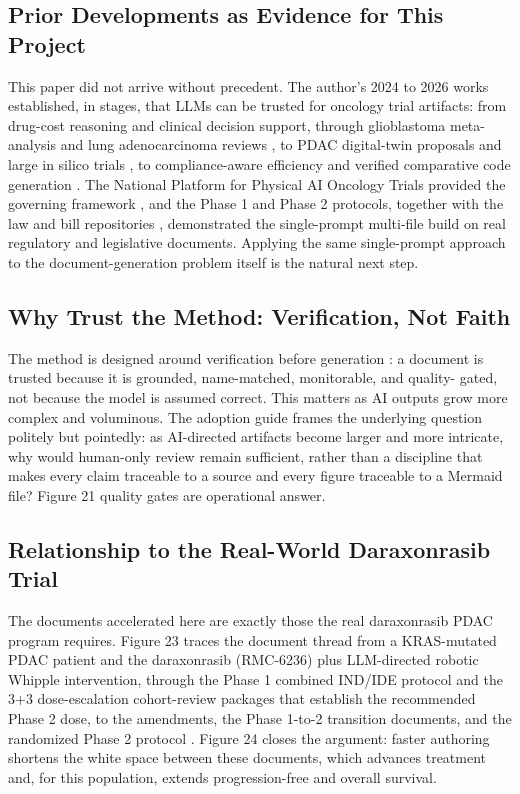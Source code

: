 \subsection{Prior Developments as Evidence for This Project}

This paper did not arrive without precedent. The author's 2024 to 2026 works
established, in stages, that LLMs can be trusted for oncology trial artifacts: from
drug-cost reasoning and clinical decision support, through glioblastoma meta-analysis
and lung adenocarcinoma reviews \cite{gbmmeta10yr, lungadeno}, to PDAC digital-twin
proposals and large in silico trials \cite{kawchak_2025_15735068,
kawchak_2025_16415815, kawchak_2025_17001137}, to compliance-aware efficiency and
verified comparative code generation \cite{e2eoncoeff, codegen16}. The National
Platform for Physical AI Oncology Trials provided the governing framework
\cite{natplatform}, and the Phase 1 \cite{phase1protocol} and Phase 2
\cite{phase2protocol} protocols, together with the law and bill repositories
\cite{lawnarrative, adoptionguide, lawenactment, hr9510v5, bill01v4}, demonstrated
the single-prompt multi-file build on real regulatory and legislative documents.
Applying the same single-prompt approach to the document-generation problem itself is
the natural next step.

\subsection{Why Trust the Method: Verification, Not Faith}

The method is designed around verification before generation \cite{hr9510v5}: a
document is trusted because it is grounded, name-matched, monitorable, and quality-
gated, not because the model is assumed correct. This matters as AI outputs grow more
complex and voluminous. The adoption guide frames the underlying question politely
but pointedly: as AI-directed artifacts become larger and more intricate, why would
human-only review remain sufficient, rather than a discipline that makes every claim
traceable to a source and every figure traceable to a Mermaid file? Figure 21 quality gates are operational answer.

\subsection{Relationship to the Real-World Daraxonrasib Trial}

The documents accelerated here are exactly those the real daraxonrasib PDAC program
requires. Figure 23 traces the document thread from a KRAS-mutated PDAC patient and
the daraxonrasib (RMC-6236) plus LLM-directed robotic Whipple intervention, through
the Phase 1 combined IND/IDE protocol \cite{phase1protocol} and the 3+3
dose-escalation cohort-review packages that establish the recommended Phase 2 dose,
to the amendments, the Phase 1-to-2 transition documents, and the randomized Phase 2
protocol \cite{phase2protocol, kawchak_2026_20196639}. Figure 24 closes the argument:
faster authoring shortens the white space between these documents, which advances
treatment and, for this population, extends progression-free and overall survival.

